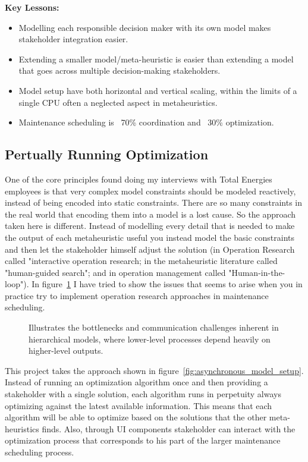 \textbf{Key Lessons:}
\begin{itemize}
	\item Modelling each responsible decision maker with its own model makes stakeholder integration easier.
	\item Extending a smaller model/meta-heuristic is easier than extending a model that goes across multiple decision-making stakeholders.
	\item Model setup have both horizontal and vertical scaling, within the limits of a single CPU often a neglected aspect in metaheuristics. 
	\item Maintenance scheduling is ~70\% coordination and ~30\% optimization.
\end{itemize}

\subsection*{Pertually Running Optimization}
One of the core principles found doing my interviews with Total Energies employees is that very complex model constraints should be modeled reactively, instead 
of being encoded into static constraints. There are so many constraints in the real world that 
encoding them into a model is a lost cause. So the approach taken here is different. Instead of modelling every
detail that is needed to make the output of each metaheuristic useful you instead model the basic constraints and then let 
the stakeholder himself adjust the solution (in Operation Research called "interactive operation research; in the metaheuristic literature called
"human-guided search"; and in operation management called "Human-in-the-loop"). In figure~\ref{fig:model-setup:classic-hierarchical}
I have tried to show the issues that seems to arise when you in practice try to implement operation research approaches in maintenance scheduling.

\begin{figure}[H]
	\centering
	
	\caption{
		Illustrates the bottlenecks and communication challenges inherent in hierarchical models, where lower-level processes depend heavily on higher-level outputs.
	}
	\label{fig:model-setup:classic-hierarchical}
\end{figure}

This project takes the approach shown in figure~\ref{fig:asynchronous_model_setup}. 
Instead of running an optimization algorithm once and then providing a stakeholder with a single 
solution, each algorithm runs in perpetuity always optimizing against the latest available information. This means that each algorithm will
be able to optimize based on the solutions that the other meta-heuristics finds. Also, through UI components stakeholder can interact with the
optimization process that corresponds to his part of the larger maintenance scheduling process. 

